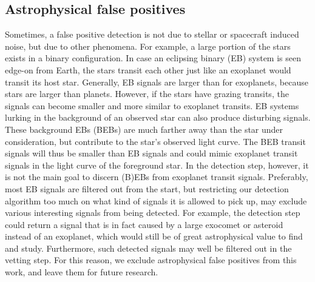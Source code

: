 \subsection{Astrophysical false positives}
\label{sec:astro_false_pos}

Sometimes, a false positive detection is not due to stellar or spacecraft induced noise, but due to other phenomena. For example, a large portion of the stars exists in a binary configuration. In case an eclipsing binary (EB) system is seen edge-on from Earth, the stars transit each other just like an exoplanet would transit its host star. Generally, EB signals are larger than for exoplanets, because stars are larger than planets. However, if the stars have grazing transits, the signals can become smaller and more similar to exoplanet transits. EB systems lurking in the background of an observed star can also produce disturbing signals. These background EBs (BEBs) are much farther away than the star under consideration, but contribute to the star's observed light curve. The BEB transit signals will thus be smaller than EB signals and could mimic exoplanet transit signals in the light curve of the foreground star. In the detection step, however, it is not the main goal to discern (B)EBs from exoplanet transit signals. Preferably, most EB signals are filtered out from the start, but restricting our detection algorithm too much on what kind of signals it is allowed to pick up, may exclude various interesting signals from being detected. For example, the detection step could return a signal that is in fact caused by a large exocomet or asteroid instead of an exoplanet, which would still be of great astrophysical value to find and study. Furthermore, such detected signals may well be filtered out in the vetting step. For this reason, we exclude astrophysical false positives from this work, and leave them for future research.